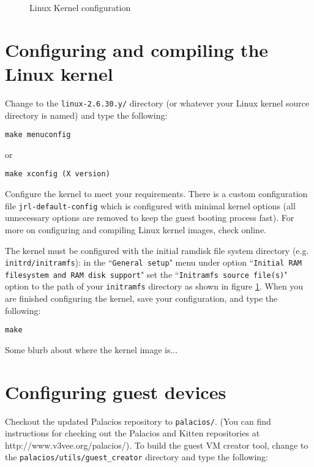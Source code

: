 \documentclass{article}[11pt]
\def\colfigsize{\epsfxsize=5in}
\begin{document}
\begin{figure}[h]\begin{center}\colfigsize{}\end{center}\caption{Linux Kernel configuration}\label{fig:linuxcf}\end{figure}



\section{Configuring and compiling the Linux kernel}

Change to the \verb|linux-2.6.30.y/| directory (or whatever your Linux kernel
source directory is named) and type the following:

\begin{verbatim}
make menuconfig
\end{verbatim}
or
\begin{verbatim}
make xconfig (X version)
\end{verbatim}

\vspace{10pt}
\noindent
Configure the kernel to meet your requirements. There is a custom configuration
file \verb|jrl-default-config| which is configured with minimal kernel options
(all unnecessary options are removed to keep the guest booting process fast).
For more on configuring and compiling Linux kernel images, check online.

\vspace{5pt}
\noindent
The kernel must be configured with the initial ramdisk file system directory
(e.g. \verb|initrd/initramfs|): in the ``\verb|General setup|" menu under
option
``\verb|Initial RAM filesystem and RAM disk support|" set the
``\verb|Initramfs source file(s)|" option to the path of your \verb|initramfs|
directory as shown in figure \ref{fig:linuxcf}. When you are finished
configuring the kernel, save your configuration, and type the following:
\begin{verbatim}
make
\end{verbatim}
Some blurb about where the kernel image is...




\section{Configuring guest devices}

Checkout the updated Palacios repository to \verb|palacios/|.  (You can find
instructions for checking out the Palacios and Kitten repositories at
http://www.v3vee.org/palacios/). To build the guest VM creator tool, change to
the \verb|palacios/utils/guest_creator| directory and type the following:
\end{document}

